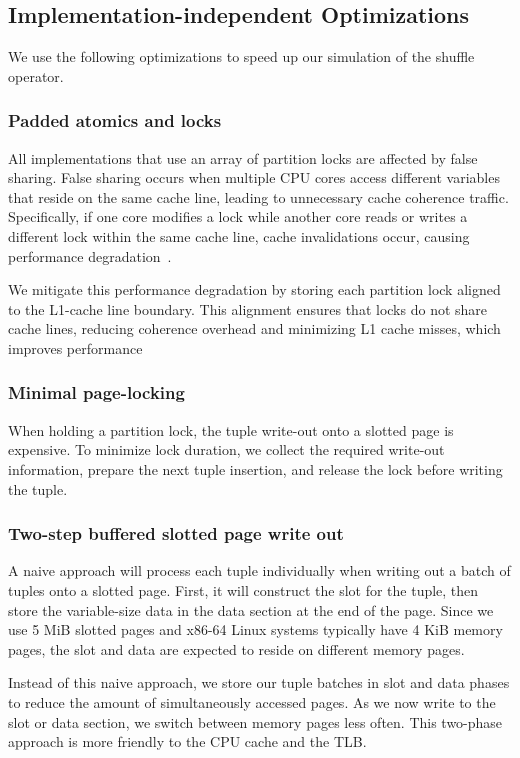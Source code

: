 \subsection{Implementation-independent Optimizations}
We use the following optimizations to speed up our simulation of the shuffle operator.
\subsubsection{Padded atomics and locks}
All implementations that use an array of partition locks are affected by false sharing.
False sharing occurs when multiple CPU cores access different variables that reside on the same cache line, leading to unnecessary cache coherence traffic.
Specifically, if one core modifies a lock while another core reads or writes a different lock within the same cache line, cache invalidations occur, causing performance degradation~\parencite{what-every-programmer-should-know-about-memory}.

We mitigate this performance degradation by storing each partition lock aligned to the L1-cache line boundary.
This alignment ensures that locks do not share cache lines, reducing coherence overhead and minimizing L1 cache misses, which improves performance

\subsubsection{Minimal page-locking} When holding a partition lock, the tuple write-out onto a slotted page is expensive.
To minimize lock duration, we collect the required write-out information, prepare the next tuple insertion, and release the lock before writing the tuple.

\subsubsection{Two-step buffered slotted page write out}
A naive approach will process each tuple individually when writing out a batch of tuples onto a slotted page.
First, it will construct the slot for the tuple, then store the variable-size data in the data section at the end of the page.
Since we use 5 MiB slotted pages and x86-64 Linux systems typically have 4 KiB memory pages, the slot and data are expected to reside on different memory pages.

Instead of this naive approach, we store our tuple batches in slot and data phases to reduce the amount of simultaneously accessed pages.
As we now write to the slot or data section, we switch between memory pages less often.
This two-phase approach is more friendly to the \ac{CPU} cache and the \ac{TLB}.
